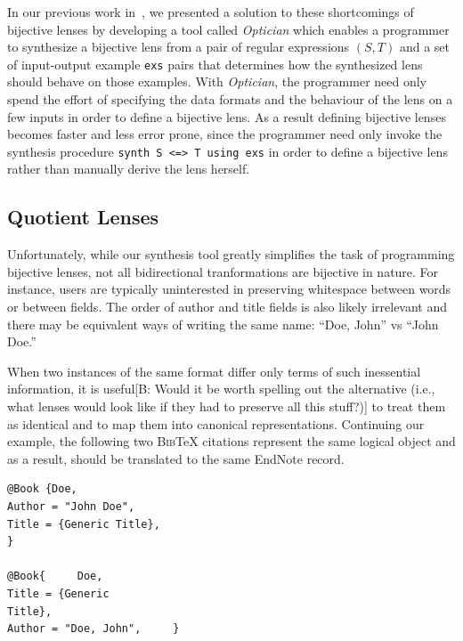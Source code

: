 \documentclass[acmsmall,review,anonymous]{acmart}
\newcommand{\FINISH}[3]{\ifdraft\textcolor{#1}{[#2: #3]}\fi}
\newcommand{\bcp}[1]{\FINISH{dkred}{B}{#1}}
\newcommand{\bibtex}{\textsc{Bib}\TeX{}}
\newcommand{\cd}[1]{\lstinline[backgroundcolor=\color{white}]$#1$}
\begin{document}
In our previous work in~\cite{optician}, we presented a solution to these
shortcomings of bijective lenses by developing a tool called {\em Optician}
which enables a programmer to synthesize a bijective lens from a pair of regular
expressions $(S, T)$ and a set of input-output example \cd{exs} pairs that
determines how the synthesized lens should behave on those examples. With {\em
Optician}, the programmer need only spend the effort of specifying the data
formats and the behaviour of the lens on a few inputs in order to define a
bijective lens. As a result defining bijective lenses becomes faster and less
error prone, since the programmer need only invoke the synthesis procedure
\lstinline{synth S <=> T using exs} in order to define a bijective lens rather
than manually derive the lens herself.

\subsection{Quotient Lenses}
Unfortunately, while our synthesis tool greatly simplifies the task of
programming bijective lenses, not all bidirectional tranformations are bijective
in nature. For instance, users are typically uninterested in preserving
whitespace between words or between fields.  The order of author and title
fields is also likely irrelevant and there may be equivalent ways of writing
the same name:  ``Doe, John'' vs ``John Doe.''

When two instances of the same format differ only terms of such inessential
information, it is useful\bcp{Would it be worth spelling out the alternative
(i.e., what lenses would look like if they had to preserve all this stuff?)}
to treat them as identical and to map them into canonical representations.
Continuing our example, the following two \bibtex{} citations represent the same
logical object and as a result, should be translated to the same EndNote record.
\begin{verbatim}
@Book {Doe,
Author = "John Doe",
Title = {Generic Title},
}

@Book{     Doe,
Title = {Generic
Title},
Author = "Doe, John",     }
\end{verbatim}
\end{document}
